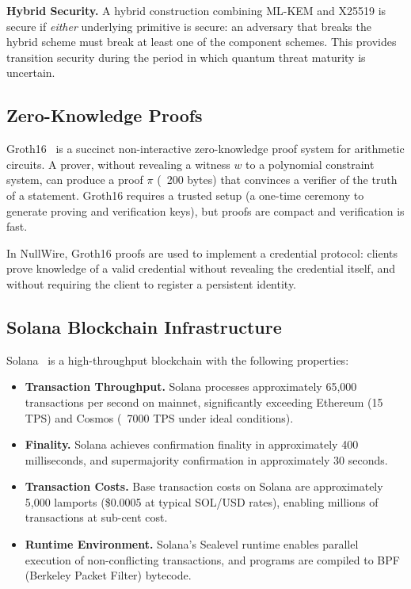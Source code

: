 \documentclass[11pt]{article}
\theoremstyle{definition}
\theoremstyle{remark}
\begin{document}
\textbf{Hybrid Security.} A hybrid construction combining ML-KEM and X25519 is secure if \emph{either} underlying primitive is secure: an adversary that breaks the hybrid scheme must break at least one of the component schemes. This provides transition security during the period in which quantum threat maturity is uncertain.

\subsection{Zero-Knowledge Proofs}

Groth16~\cite{groth16} is a succinct non-interactive zero-knowledge proof system for arithmetic circuits. A prover, without revealing a witness $w$ to a polynomial constraint system, can produce a proof $\pi$ (~200 bytes) that convinces a verifier of the truth of a statement. Groth16 requires a trusted setup (a one-time ceremony to generate proving and verification keys), but proofs are compact and verification is fast.

In NullWire, Groth16 proofs are used to implement a credential protocol: clients prove knowledge of a valid credential without revealing the credential itself, and without requiring the client to register a persistent identity.

\subsection{Solana Blockchain Infrastructure}

Solana~\cite{solana} is a high-throughput blockchain with the following properties:

\begin{itemize}
    \item \textbf{Transaction Throughput.} Solana processes approximately 65,000 transactions per second on mainnet, significantly exceeding Ethereum (15 TPS) and Cosmos (~7000 TPS under ideal conditions).

    \item \textbf{Finality.} Solana achieves confirmation finality in approximately 400 milliseconds, and supermajority confirmation in approximately 30 seconds.

    \item \textbf{Transaction Costs.} Base transaction costs on Solana are approximately 5,000 lamports (\$0.0005 at typical SOL/USD rates), enabling millions of transactions at sub-cent cost.

    \item \textbf{Runtime Environment.} Solana's Sealevel runtime enables parallel execution of non-conflicting transactions, and programs are compiled to BPF (Berkeley Packet Filter) bytecode.
\end{itemize}
\end{document}
